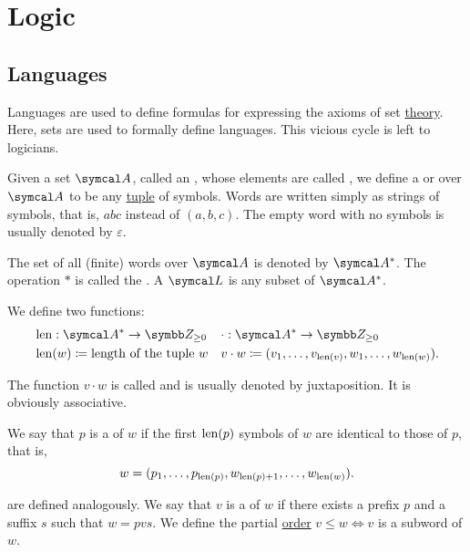 \section{Logic}\label{sec:logic}
\subsection{Languages}\label{subsec:languages}

\begin{remark}\label{remark:language_definitions_using_sets}
  Languages are used to define formulas for expressing the axioms of set \hyperref[def:set_zfc]{theory}. Here, sets are used to formally define languages. This vicious cycle is left to logicians.
\end{remark}

\begin{definition}\label{def:language}
  Given a set \( \Cal{A} \), called an , whose elements are called , we define a  or  over \( \Cal{A} \) to be any \hyperref[def:cartesian_product]{tuple} of symbols. Words are written simply as strings of symbols, that is, \( abc \) instead of \( (a, b, c) \). The empty word with no symbols is usually denoted by \( \varepsilon \).

  The set of all (finite) words over \( \Cal{A} \) is denoted by \( \Cal{A}^{*} \). The operation \( * \) is called the . A  \( \Cal{L} \) is any subset of \( \Cal{A}^{*} \).

  We define two functions:
  \begin{align*}
    &\Len: \Cal{A}^{*} \to \BZ_{\geq 0}
    &&\cdot: \Cal{A}^{*} \to \BZ_{\geq 0}
    \\
    &\Len(w) \coloneqq \text{length of the tuple } w
    &&v \cdot w \coloneqq (v_1, \ldots, v_{\Len(v)}, w_1, \ldots, w_{\Len(w)}).
  \end{align*}

  The function \( v \cdot w \) is called  and is usually denoted by juxtaposition. It is obviously associative.

  We say that \( p \) is a  of \( w \) if the first \( \operatorname{len}(p) \) symbols of \( w \) are identical to those of \( p \), that is,
  \begin{equation*}
    w = (p_1, \ldots, p_{\operatorname{len}(p)}, w_{\operatorname{len}(p) + 1}, \ldots, w_{\operatorname{len}(w)}).
  \end{equation*}

   are defined analogously. We say that \( v \) is a  of \( w \) if there exists a prefix \( p \) and a suffix \( s \) such that \( w = pvs \). We define the partial \hyperref[def:poset]{order} \( v \leq w \iff v \) is a subword of \( w \).


\end{definition}
